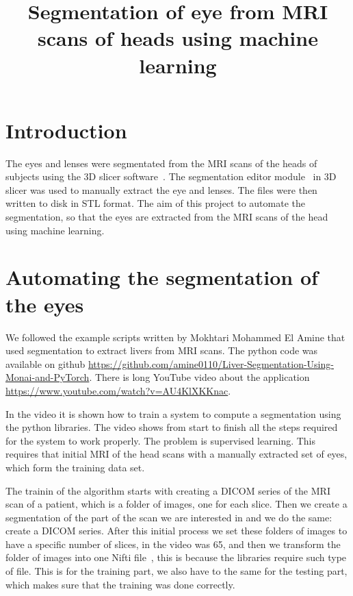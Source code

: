 \documentclass[12pt]{article}
\begin{document}
\title{Segmentation of eye from MRI scans of heads using machine learning}
\date{}

\maketitle


\section{Introduction}

The eyes and lenses were segmentated from the MRI scans of the heads
of subjects using the 3D slicer software~\cite{kikinis20133d}.  The
segmentation editor module~\cite{pinter2019polymorph} in 3D slicer was
used to manually extract the eye and lenses.  The files were then
written to disk in STL format. The aim of this project to automate the
segmentation, so that the eyes are extracted from the MRI scans
of the head using machine learning.

\section{Automating the segmentation of the eyes}

We followed the example scripts written by
Mokhtari Mohammed El Amine that used segmentation to extract
livers from MRI scans. The python code was available
on github
\url{https://github.com/amine0110/Liver-Segmentation-Using-Monai-and-PyTorch}. There
is long YouTube video about the application
\url{https://www.youtube.com/watch?v=AU4KlXKKnac}.


In the video it is shown how to train a system to compute a
segmentation using the python libraries. The video shows
from start to finish all the steps required for the system to work
properly. The problem is supervised learning. This requires that
initial MRI of the head scans with  a manually extracted set of eyes,
which form the training data set.


The trainin of the algorithm starts with creating a DICOM series of
the MRI scan of a patient, which is a folder of images, one for each
slice. Then we create a segmentation of the part of the scan we are
interested in and we do the same: create a DICOM series. After this
initial process we set these folders of images to have a specific
number of slices, in the video was 65, and then we transform the
folder of images into one Nifti file~\cite{li2016first},
this is because the libraries
require such type of file. This is for the training part, we also have
to the same for the testing part, which makes sure that the training
was done correctly.
\end{document}

